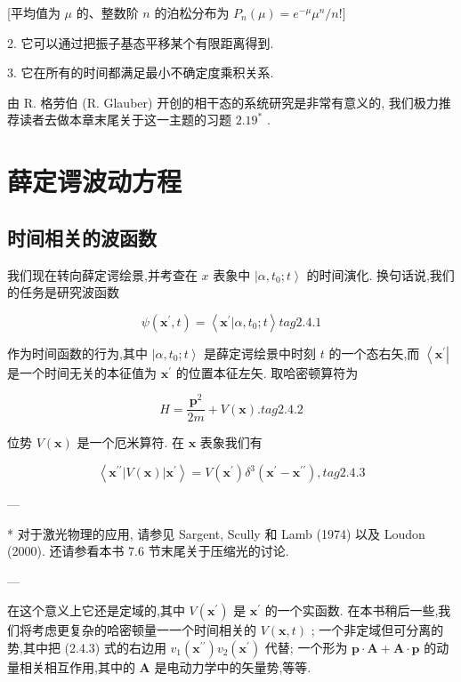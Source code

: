\documentclass[lang=cn,newtx,10pt,scheme=chinese,thmcnt=section]{elegantbook}
\begin{document}
[平均值为 $\mu$ 的、整数阶 $n$ 的泊松分布为 ${P}_{n}\left( \mu \right) = {e}^{-\mu }{\mu }^{n}/n!\rbrack$

2. 它可以通过把振子基态平移某个有限距离得到.

3. 它在所有的时间都满足最小不确定度乘积关系.

由 R. 格劳伯 (R. Glauber) 开创的相干态的系统研究是非常有意义的, 我们极力推荐读者去做本章末尾关于这一主题的习题 ${2.19}^{ * }$ .
\section{薛定谔波动方程}
\subsection*{时间相关的波函数}
我们现在转向薛定谔绘景,并考查在 $x$ 表象中 $\left| {\alpha ,{t}_{0};t}\right\rangle$ 的时间演化. 换句话说,我们的任务是研究波函数

$$
\psi \left( {{\mathbf{x}}^{\prime }, t}\right) = \left\langle {{\mathbf{x}}^{\prime } | \alpha ,{t}_{0};t}\right\rangle tag{2.4.1}
$$

作为时间函数的行为,其中 $\left| {\alpha ,{t}_{0};t}\right\rangle$ 是薛定谔绘景中时刻 $t$ 的一个态右矢,而 $\left\langle {\mathbf{x}}^{\prime }\right|$ 是一个时间无关的本征值为 ${\mathbf{x}}^{\prime }$ 的位置本征左矢. 取哈密顿算符为

$$
H = \frac{{\mathbf{p}}^{2}}{2m} + V\left( \mathbf{x}\right) . tag{2.4.2}
$$

位势 $V\left( \mathbf{x}\right)$ 是一个厄米算符. 在 $\mathbf{x}$ 表象我们有

$$
\left\langle {{\mathbf{x}}^{\prime \prime }\left| {V\left( \mathbf{x}\right) }\right| {\mathbf{x}}^{\prime }}\right\rangle = V\left( {\mathbf{x}}^{\prime }\right) {\delta }^{3}\left( {{\mathbf{x}}^{\prime } - {\mathbf{x}}^{\prime \prime }}\right) , tag{2.4.3}
$$

---

* 对于激光物理的应用, 请参见 Sargent, Scully 和 Lamb (1974) 以及 Loudon (2000). 还请参看本书 7.6 节末尾关于压缩光的讨论.

---

在这个意义上它还是定域的,其中 $V\left( {\mathbf{x}}^{\prime }\right)$ 是 ${\mathbf{x}}^{\prime }$ 的一个实函数. 在本书稍后一些,我们将考虑更复杂的哈密顿量一一个时间相关的 $V\left( {\mathbf{x}, t}\right)$ ; 一个非定域但可分离的势,其中把 (2.4.3) 式的右边用 ${v}_{1}\left( {\mathbf{x}}^{\prime \prime }\right) {v}_{2}\left( {\mathbf{x}}^{\prime }\right)$ 代替; 一个形为 $\mathbf{p} \cdot \mathbf{A} + \mathbf{A} \cdot \mathbf{p}$ 的动量相关相互作用,其中的 $\mathbf{A}$ 是电动力学中的矢量势,等等.
\end{document}
